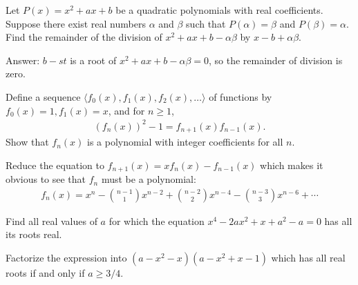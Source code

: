 \begin{tcolorbox}
\begin{question}
Let $P(x)=x^2+ax+b$ be a quadratic polynomials with real coefficients. Suppose there exist real numbers $\alpha$ and $\beta$ such that $P(\alpha)=\beta$ and $P(\beta)=\alpha$. Find the remainder of the division of $x^2+ax+b-\alpha\beta$ by $x-b+\alpha\beta$.
\end{question}
\end{tcolorbox}


\begin{solution}[name=Solution by CRMO 2015]
Answer: $b-st$ is a root of $x^2+ax+b-\alpha\beta=0$, so the remainder of division is zero.
\end{solution}



\begin{tcolorbox}
\begin{question}
Define a sequence $\langle f_0(x), f_1(x), f_2(x), \dots \rangle$ of functions by $f_0(x)=1, f_1(x)=x$, and for $n\geq 1$,
\begin{align*}
    \left(f_n(x)\right)^2 - 1 = f_{n+1}(x)f_{n-1}(x).
\end{align*}
Show that $f_n(x)$ is a polynomial with integer coefficients for all $n$.
\end{question}
\end{tcolorbox}


\begin{solution}[name=Solution by INMO 2012]
Reduce the equation to $f_{n+1}(x) = xf_n(x) - f_{n-1}(x)$ which makes it obvious to see that $f_n$ must be a polynomial:
\begin{align*}
    f_n(x) = x^n - \binom{n-1}{1} x^{n-2} + \binom{n-2}{2} x^{n-4} -\binom{n-3}{3} x^{n-6} + \cdots  
\end{align*}
\end{solution}


\begin{tcolorbox}
\begin{question}
Find all real values of $a$ for which the equation $x^4-2ax^2+x+a^2-a=0$ has all its roots real.
\end{question}
\end{tcolorbox}


\begin{solution}[name=Solution by RMO 2000]
Factorize the expression into $(a-x^2-x)(a-x^2+x-1)$ which has all real roots if and only if $a \geq 3/4$.
\end{solution}


